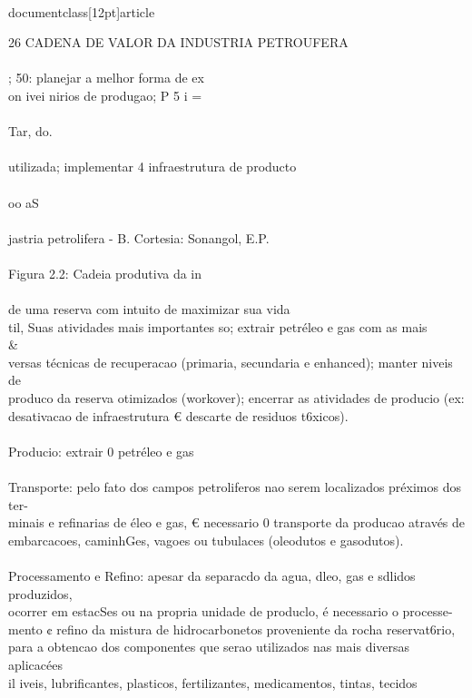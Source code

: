 \\documentclass[12pt]{article}
\begin{document}
26 CADENA DE VALOR DA INDUSTRIA PETROUFERA\\
\\
; 50: planejar a melhor forma de ex\\
on ivei nirios de produgao; P 5 i =\\
\\
Tar, do.\\
\\
utilizada; implementar 4 infraestrutura de producto\\
\\
oo aS\\
\\
jastria petrolifera - B. Cortesia: Sonangol, E.P.\\
\\
Figura 2.2: Cadeia produtiva da in\\
\\
de uma reserva com intuito de maximizar sua vida\\
til, Suas atividades mais importantes so; extrair petréleo e gas com as mais \\&\\
versas técnicas de recuperacao (primaria, secundaria e enhanced); manter niveis de\\
produco da reserva otimizados (workover); encerrar as atividades de producio (ex:\\
desativacao de infraestrutura € descarte de residuos t6xicos).\\
\\
Producio: extrair 0 petréleo e gas\\
\\
Transporte: pelo fato dos campos petroliferos nao serem localizados préximos dos ter-\\
minais e refinarias de éleo e gas, € necessario 0 transporte da producao através de\\
embarcacoes, caminhGes, vagoes ou tubulaces (oleodutos e gasodutos).\\
\\
Processamento e Refino: apesar da separacdo da agua, dleo, gas e sdlidos produzidos,\\
ocorrer em estacSes ou na propria unidade de produclo, é necessario o processe-\\
mento ¢ refino da mistura de hidrocarbonetos proveniente da rocha reservat6rio,\\
para a obtencao dos componentes que serao utilizados nas mais diversas aplicacées\\
il iveis, lubrificantes, plasticos, fertilizantes, medicamentos, tintas, tecidos\\
\end{document}
